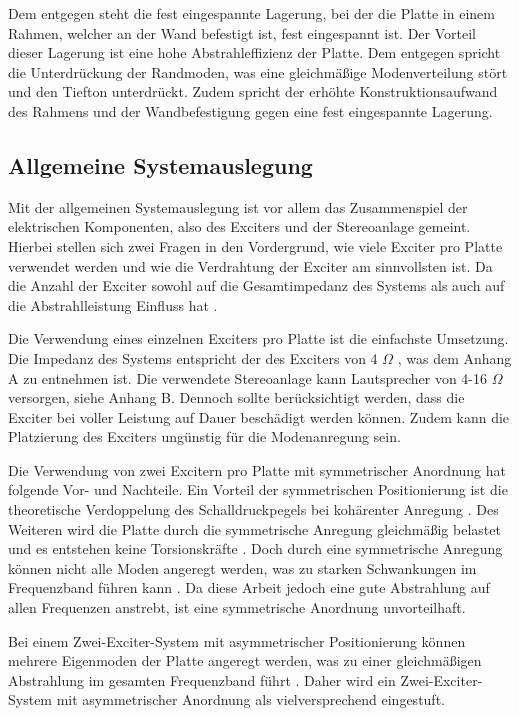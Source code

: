 Dem entgegen steht die fest eingespannte Lagerung, bei der die Platte in einem Rahmen, welcher an der Wand befestigt ist, fest eingespannt ist. Der Vorteil dieser Lagerung ist eine hohe Abstrahleffizienz der Platte. Dem entgegen spricht die Unterdrückung der Randmoden, was eine gleichmäßige Modenverteilung stört und den Tiefton unterdrückt. Zudem spricht der erhöhte Konstruktionsaufwand des Rahmens und der Wandbefestigung gegen eine fest eingespannte Lagerung. 


\subsection{Allgemeine Systemauslegung}

Mit der allgemeinen Systemauslegung ist vor allem das Zusammenspiel der elektrischen Komponenten, also des Exciters und der Stereoanlage gemeint. Hierbei stellen sich zwei Fragen in den Vordergrund, wie viele Exciter pro Platte verwendet werden und wie die Verdrahtung der Exciter am sinnvollsten ist.
Da die Anzahl der Exciter sowohl auf die Gesamtimpedanz des Systems als auch auf die Abstrahlleistung Einfluss hat \cite{Bai2001}.

Die Verwendung eines einzelnen Exciters pro Platte ist die einfachste Umsetzung. Die Impedanz des Systems entspricht der des Exciters von 4 $\Omega$ \cite{DaytonAudio2024}, was dem Anhang A zu entnehmen ist. Die verwendete Stereoanlage kann Lautsprecher von 4-16 $\Omega$ versorgen, siehe Anhang B. Dennoch sollte berücksichtigt werden, dass die Exciter bei voller Leistung auf Dauer beschädigt werden können. Zudem kann die Platzierung des Exciters ungünstig für die Modenanregung sein. 

Die Verwendung von zwei Excitern pro Platte mit symmetrischer Anordnung hat folgende Vor- und Nachteile. Ein Vorteil der symmetrischen Positionierung ist die theoretische Verdoppelung des Schalldruckpegels bei kohärenter Anregung \cite{Moeser2005}. Des Weiteren wird die Platte durch die symmetrische Anregung gleichmäßig belastet und es entstehen keine Torsionskräfte \cite{Moeser2005}. Doch durch eine symmetrische Anregung können nicht alle Moden angeregt werden, was zu starken Schwankungen im Frequenzband führen kann \cite{Pueo2009}. Da diese Arbeit jedoch eine gute Abstrahlung auf allen Frequenzen anstrebt, ist eine symmetrische Anordnung unvorteilhaft. 

Bei einem Zwei-Exciter-System mit asymmetrischer Positionierung können mehrere Eigenmoden der Platte angeregt werden, was zu einer gleichmäßigen Abstrahlung im gesamten Frequenzband führt \cite{Zenker2019}. Daher wird ein Zwei-Exciter-System mit asymmetrischer Anordnung als vielversprechend eingestuft.  

